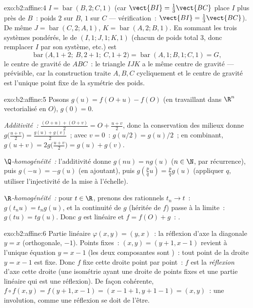 \begin{solution}{exo:b2:affine:4}
$I = \operatorname{bar}(B, 2; C, 1)$ (car $\vect{BI} =
\frac13\vect{BC}$ place $I$ plus près de $B$~: poids $2$ sur $B$,
$1$ sur $C$ --- vérification~: $\vect{BI} = \frac{1}{3}\vect{BC}$).
De même $J = \operatorname{bar}(C, 2; A, 1)$, $K =
\operatorname{bar}(A, 2; B, 1)$. En sommant les trois systèmes
pondérés, le  de $(I, 1; J, 1; K, 1)$ (chacun de poids
total $3$, donc remplacer $I$ par son système, etc.) est
\[
\operatorname{bar}\bigl(A, 1 + 2;\ B, 2 + 1;\ C, 1 + 2\bigr)
= \operatorname{bar}(A, 1; B, 1; C, 1) = G ,
\]
le centre de gravité de $ABC$~: le triangle $IJK$ a le même centre de
gravité --- prévisible, car la construction traite $A, B, C$
cycliquement et le centre de gravité est l'unique point fixe de la
symétrie  des poids.
\end{solution}

\begin{solution}{exo:b2:affine:5}
Posons $g(u) = f(O + u) - f(O)$ (en travaillant dans $\R^n$
vectorialisé en $O$), $g(0) = 0$.

\emph{Additivité~:} $\frac{(O + u) + (O + v)}{2} = O + \frac{u +
v}{2}$, donc la conservation des milieux donne
$g\bigl(\frac{u+v}{2}\bigr) = \frac{g(u) + g(v)}{2}$~; avec $v = 0$~:
$g(u/2) = g(u)/2$~; en combinant, $g(u + v) =
2g\bigl(\frac{u+v}{2}\bigr) = g(u) + g(v)$.

\emph{$\Q$-homogénéité~:} l'additivité donne $g(nu) = ng(u)$ ($n \in
\N$, par récurrence), puis $g(-u) = -g(u)$ (en ajoutant), puis
$g(\frac pq u) = \frac pq g(u)$ (appliquer $q$, utiliser
l'injectivité de la mise à l'échelle).

\emph{$\R$-homogénéité~:} pour $t \in \R$, prenons des rationnels $t_n
\to t$~: $g(t_nu) = t_ng(u)$, et la continuité de $g$ (héritée de $f$)
passe à la limite~: $g(tu) = tg(u)$. Donc $g$ est linéaire et $f =
f(O) + g$~: .
\end{solution}

\begin{solution}{exo:b2:affine:6}
Partie linéaire $\varphi(x,y) = (y, x)$~: la réflexion d'axe la
diagonale $y = x$ (orthogonale,  $-1$). Points fixes~: $(x,
y) = (y + 1, x - 1)$ revient à l'unique équation $y = x - 1$ (les deux
composantes sont )~: tout point de la droite $y = x - 1$
est fixe. Donc $f$ fixe cette droite point par point~: $f$
est la \emph{réflexion} d'axe cette droite (une isométrie ayant une
droite de points fixes et une partie linéaire qui est une réflexion).
De façon cohérente, $f \circ f(x,y) = f(y+1, x-1) = (x - 1 + 1, y + 1
- 1) = (x, y)$~: une involution, comme une réflexion se doit de
l'être.
\end{solution}

